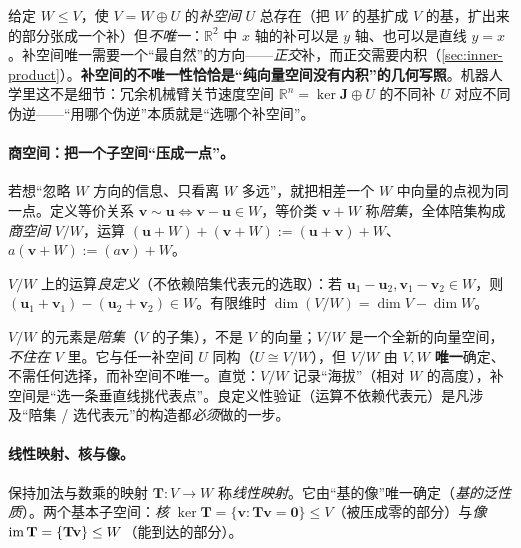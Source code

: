 \begin{insight}
给定 $W\le V$，使 $V=W\oplus U$ 的\emph{补空间} $U$ 总存在（把 $W$ 的基扩成 $V$ 的基，扩出来的部分张成一个补）但\emph{不唯一}：$\mathbb{R}^2$ 中 $x$ 轴的补可以是 $y$ 轴、也可以是直线 $y=x$。补空间唯一需要一个“最自然”的方向——\emph{正交}补，而正交需要内积（\cref{sec:inner-product}）。\textbf{补空间的不唯一性恰恰是“纯向量空间没有内积”的几何写照}。机器人学里这不是细节：冗余机械臂关节速度空间 $\mathbb{R}^n=\ker\mathbf{J}\oplus U$ 的不同补 $U$ 对应不同伪逆——“用哪个伪逆”本质就是“选哪个补空间”。
\end{insight}

\paragraph{商空间：把一个子空间“压成一点”。}
若想“忽略 $W$ 方向的信息、只看离 $W$ 多远”，就把相差一个 $W$ 中向量的点视为同一点。定义等价关系 $\mathbf{v}\sim\mathbf{u}\iff\mathbf{v}-\mathbf{u}\in W$，等价类 $\mathbf{v}+W$ 称\emph{陪集}，全体陪集构成\emph{商空间} $V/W$，运算 $(\mathbf{u}+W)+(\mathbf{v}+W):=(\mathbf{u}+\mathbf{v})+W$、$a(\mathbf{v}+W):=(a\mathbf{v})+W$。

\begin{proposition}[商空间维数与良定义]\label{prop:quotient}
$V/W$ 上的运算\emph{良定义}（不依赖陪集代表元的选取）：若 $\mathbf{u}_1-\mathbf{u}_2,\mathbf{v}_1-\mathbf{v}_2\in W$，则 $(\mathbf{u}_1+\mathbf{v}_1)-(\mathbf{u}_2+\mathbf{v}_2)\in W$。有限维时 $\dim(V/W)=\dim V-\dim W$。
\end{proposition}

\begin{pitfall}
$V/W$ 的元素是\emph{陪集}（$V$ 的子集），不是 $V$ 的向量；$V/W$ 是一个全新的向量空间，\emph{不住在} $V$ 里。它与任一补空间 $U$ 同构（$U\cong V/W$），但 $V/W$ 由 $V,W$ \textbf{唯一}确定、不需任何选择，而补空间不唯一。直觉：$V/W$ 记录“海拔”（相对 $W$ 的高度），补空间是“选一条垂直线挑代表点”。良定义性验证（运算不依赖代表元）是凡涉及“陪集 / 选代表元”的构造都\emph{必须}做的一步。
\end{pitfall}

\paragraph{线性映射、核与像。}
保持加法与数乘的映射 $\mathbf{T}:V\to W$ 称\emph{线性映射}。它由“基的像”唯一确定（\emph{基的泛性质}）。两个基本子空间：\emph{核} $\ker\mathbf{T}=\{\mathbf{v}:\mathbf{T}\mathbf{v}=\mathbf{0}\}\le V$（被压成零的部分）与\emph{像} $\operatorname{im}\mathbf{T}=\{\mathbf{T}\mathbf{v}\}\le W$（能到达的部分）。

